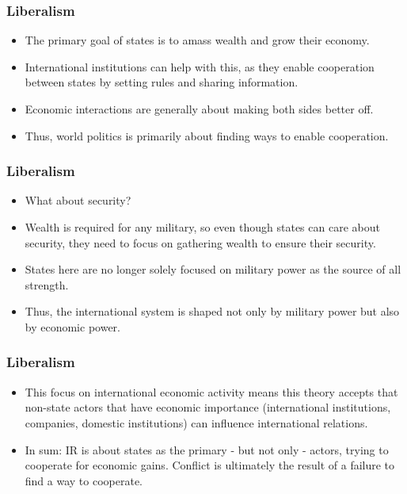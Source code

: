 \documentclass{beamer}
\begin{document}
\begin{frame} 
\frametitle{\LARGE{Liberalism}}
    \begin{itemize}
    	\item The primary goal of states is to amass wealth and grow their economy. \pause
    	\item International institutions can help with this, as they enable cooperation between states by setting rules and sharing information. \pause
        \item Economic interactions are generally about making both sides better off. \pause
        \item Thus, world politics is primarily about finding ways to enable cooperation. 
 \end{itemize}
\end{frame}

\begin{frame} 
	\frametitle{\LARGE{Liberalism}}
	\begin{itemize}
	   \item What about security? \pause
	   \item Wealth is required for any military, so even though states can care about security, they need to focus on gathering wealth to ensure their security.  \pause
	   \item States here are no longer solely focused on military power as the source of all strength. \pause
	   \item Thus, the international system is shaped not only by military power but also by economic power.  
	\end{itemize}
\end{frame}

\begin{frame} 
\frametitle{\LARGE{Liberalism}}
\begin{itemize}
	\item This focus on international economic activity means this theory accepts that non-state actors that have economic importance (international institutions, companies, domestic institutions) can influence international relations. \pause
	\item In sum: IR is about states as the primary - but not only - actors, trying to cooperate for economic gains. Conflict is ultimately the result of a failure to find a way to cooperate. 
\end{itemize}
\end{frame}
\end{document}
